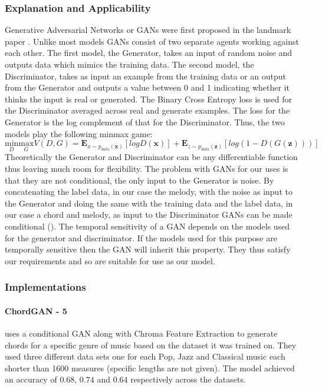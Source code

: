 \subsubsection{Explanation and Applicability}
Generative Adversarial Networks or GANs were first proposed in the landmark paper \cite{GANs}. Unlike most models GANs consist of two separate agents working against each other.
The first model, the Generator, takes an input of random noise and outputs data which mimics the training data. 
The second model, the Discriminator, takes as input an example from the training data or an output from the Generator and outputs a value between 0 and 1 indicating whether it thinks the input is real or generated.
The Binary Cross Entropy loss is used for the Discriminator averaged across real and generate examples. The loss for the Generator is the log complement of that for the Discriminator. Thus, the two models play the following minmax game:
\begin{equation}
\underset{D}{\text{min}} \underset{G}{\text{max}} V(D,G) = \mathbf{E}_{x\sim p_{data}(\mathbf{x})}[logD(\mathbf{x})] + \mathbf{E}_{z\sim p_{data}(\mathbf{z})}[log(1-D(G(\mathbf{z})))]
\end{equation} 
Theoretically the Generator and Discriminator can be any differentiable function thus leaving much room for flexibility.
The problem with GANs for our uses is that they are not conditional, the only input to the Generator is noise.
By concatenating the label data, in our case the melody, with the noise as input to the Generator and doing the same with the training data and the label data, in our case a chord and melody, as input to the Discriminator GANs can be made conditional (\cite{CGANs}). 
The temporal sensitivity of a GAN depends on the models used for the generator and discriminator.
If the models used for this purpose are temporally sensitive then the GAN will inherit this property.
They thus satisfy our requirements and so are suitable for use as our model. 

\subsubsection{Implementations}

\paragraph{ChordGAN - 5} \cite{ChordGAN} uses a conditional GAN along with Chroma Feature Extraction to generate chords for a specific genre of music based on the dataset it was trained on.
They used three different data sets one for each Pop, Jazz and Classical music each shorter than 1600 measures (specific lengths are not given).
The model achieved an accuracy of $0.68$, $0.74$ and $0.64$ respectively across the datasets.


